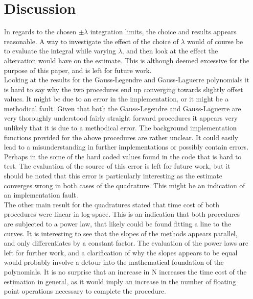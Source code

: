 \documentclass[%
reprint,nofootinbib,
amsmath,amssymb,
aps,
]{revtex4-1}
\begin{document}
\section{Discussion} \noindent 
In regards to the chosen $\pm \lambda$ integration limits, the choice and results appears reasonable. A way to investigate the effect of the choice of $\lambda$ would of course be to evaluate the integral while varying $\lambda$, and then look at the effect the altercation would have on the estimate. This is although deemed excessive for the purpose of this paper, and is left for future work. \\ \indent 
Looking at the results for the Gauss-Legendre and Gauss-Laguerre polynomials it is hard to say why the two procedures end up converging towards slightly offset values. It might be due to an error in the implementation, or it might be a methodical fault.  Given that both the Gauss-Legendre and Gauss-Laguerre are very thoroughly understood fairly straight forward procedures it appears very unlikely that it is due to a methodical error. The background implementation functions provided for the above procedures are rather unclear. It could easily lead to a misunderstanding in further implementations or possibly contain errors. Perhaps in the some of the hard coded values found in the code that is hard to test. The evaluation of the source of this error is left for future work, but it should be noted that this error is particularly interesting as the estimate converges wrong in both cases of the quadrature. This might be an indication of an implementation fault. \\ \indent
The other main result for the quadratures stated that time cost of both procedures were linear in log-space. This is an indication that both procedures are subjected to a power law, that likely could be found fitting a line to the curves. It is interesting to see that the slopes of the methods appears parallel, and only differentiates by a constant factor. The evaluation of the power laws are left for further work, and a clarification of why the slopes appears to be equal would probably involve a detour into the mathematical foundation of the polynomials. It is no surprise that an increase in N increases the time cost of the estimation in general, as it would imply an increase in the number of floating point operations necessary to complete the procedure.\\ \indent 
\end{document}
